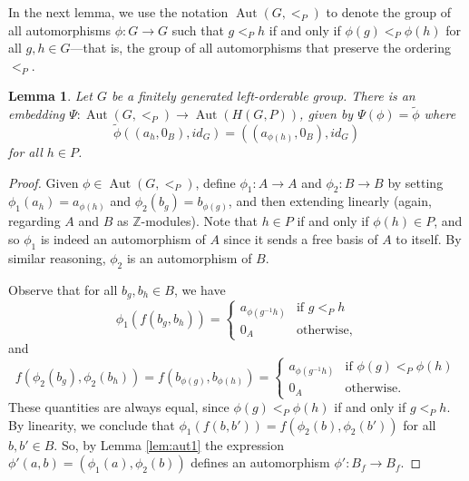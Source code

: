 \documentclass{amsart}
\newtheorem{lemma}[theorem]{Lemma}
\theoremstyle{definition}
\theoremstyle{remark}
\DeclareMathOperator{\Aut}{Aut}
\begin{document}
In the next lemma, we use the notation $\Aut(G, <_P)$ to denote the group of all automorphisms $\phi\colon G \rightarrow G$ such that $g<_Ph$ if and only if $\phi(g)<_P \phi(h)$ for all $g, h \in G$---that is, the group of all automorphisms that preserve the ordering $<_P$.


\begin{lemma}
\label{lem:aut3}
Let $G$ be a finitely generated left-orderable group.
    There is an embedding \(\Psi\colon \Aut(G, <_P) \to \Aut(H(G, P))\), given by $\Psi(\phi) =\widetilde \phi$ where
    $$\widetilde\phi((a_h, 0_B), id_G) = ((a_{\phi(h)}, 0_B), id_G)$$ for all \(h\in P\).
\end{lemma} 
\begin{proof}    
Given $\phi \in \Aut(G, <_P)$, define $\phi_1\colon A \rightarrow A$ and $\phi_2 \colon B \rightarrow B$ by setting $\phi_1(a_h) = a_{\phi(h)}$ and $\phi_2(b_g) = b_{\phi(g)}$, and then extending linearly (again, regarding $A$ and $B$ as $\mathbb{Z}$-modules). Note that $h \in P$ if and only if $\phi(h) \in P$, and so $\phi_1$ is indeed an automorphism of $A$ since it sends a free basis of $A$ to itself.  By similar reasoning, $\phi_2$ is an automorphism of $B$.

Observe that for all $b_g, b_h \in B$, we have 
\[
\phi_1(f(b_g, b_h)) =
\begin{cases}
    a_{\phi(g^{-1}h)} &\text{if \(g<_Ph\)}\\
    0_A &\text{otherwise}, 
\end{cases}
\]
and
\[
f(\phi_2(b_g), \phi_2(b_h)) =f(b_{\phi(g)}, b_{\phi(h)}) = 
\begin{cases}
    a_{\phi(g^{-1}h)} &\text{if \(\phi(g)<_P \phi(h)\)}\\
    0_A &\text{otherwise}. 
\end{cases}
\]
These quantities are always equal, since $\phi(g) <_P \phi(h)$ if and only if $g <_P h$.  By linearity, we conclude that $\phi_1(f(b, b')) = f(\phi_2(b), \phi_2(b'))$ for all $b, b' \in B$.  So, by Lemma \ref{lem:aut1} the expression $\phi'(a,b) = (\phi_1(a), \phi_2(b))$ defines an automorphism $\phi' \colon B_f \rightarrow B_f$.


\end{proof}
\end{document}
